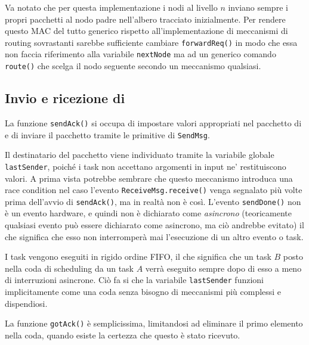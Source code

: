 \documentclass[twoside,11pt,a4paper,italian,openany]{book}
\begin{document}
Va notato che per questa implementazione i nodi al livello $n$ inviano sempre i propri 
pacchetti al nodo padre nell'albero tracciato inizialmente. 
Per rendere questo MAC del tutto generico rispetto all'implementazione di meccanismi di 
routing sovrastanti sarebbe sufficiente cambiare \texttt{forwardReq()} in modo che essa 
non faccia riferimento alla variabile  \texttt{nextNode} ma ad un generico comando 
\texttt{route()} che scelga il nodo seguente secondo un meccanismo qualsiasi.  

\subsection{Invio e ricezione di \ack}
La funzione \texttt{sendAck()} si occupa di impostare valori appropriati nel pacchetto di \ack 
e di inviare il pacchetto tramite le primitive di \texttt{SendMsg}. 

Il destinatario del pacchetto \ack viene individuato tramite la variabile 
globale \texttt{lastSender}, poiché i task non accettano argomenti in input ne' 
restituiscono valori. 
A prima vista potrebbe sembrare che questo meccanismo introduca una race condition nel 
caso l'evento \texttt{ReceiveMsg.receive()} venga segnalato più volte prima dell'avvio 
di \texttt{sendAck()},
ma in realtà non è così. L'evento \texttt{sendDone()} non è un evento hardware, e quindi non 
è dichiarato come \emph{asincrono} (teoricamente qualsiasi evento può essere dichiarato come 
asincrono, ma ciò andrebbe evitato)
 il che significa che esso non interromperà mai l'esecuzione di un altro evento o task. 

I task vengono eseguiti in rigido ordine FIFO, il che significa che un task $B$ posto nella coda
di scheduling da un task $A$ verrà eseguito sempre dopo di esso a meno di interruzioni asincrone.
Ciò fa si che la variabile \texttt{lastSender} funzioni implicitamente come una coda senza 
bisogno di meccanismi più complessi e dispendiosi. 

La funzione \texttt{gotAck()} è semplicissima, limitandosi ad eliminare il primo elemento 
nella coda, quando esiste la certezza che questo è stato ricevuto. 
\end{document}
